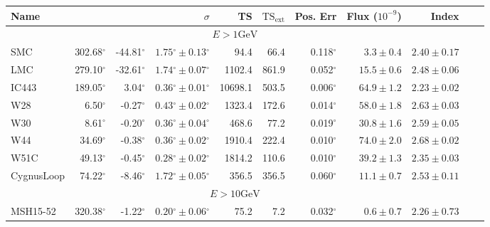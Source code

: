 \documentclass[12pt,preprint]{aastex}
\newcommand{\gev}{\text{GeV}\xspace}
\newcommand{\tsext}{{\ensuremath{\text{TS}_\text{ext}}}\xspace}
\newcommand{\glon}{\text{GLON}\xspace}
\newcommand{\glat}{\text{GLAT}\xspace}
\renewcommand{\deg}{\ensuremath{^\circ}\xspace}
\begin{document}
\clearpage
\begin{table}
    \begin{centering}
      \begin{tabular}{l|rrrrrrrrrr}
        \hline
        \hline
        Name                 &          \glon &          \glat &                    $\sigma$ &         TS &   $\tsext$ &   Pos. Err &      Flux ($10^{-9}$) &                 Index \\
        \hline
        \multicolumn{9}{c}{$E > 1 \gev$} \\
        \hline
        SMC                  &     302.68\deg &     -44.81\deg & $  1.75\deg \pm   0.13\deg$ &       94.4 &       66.4 &  0.118\deg & $    3.3 \pm     0.4$ & $   2.40 \pm    0.17$ \\
        LMC                  &     279.10\deg &     -32.61\deg & $  1.74\deg \pm   0.07\deg$ &     1102.4 &      861.9 &  0.052\deg & $   15.5 \pm     0.6$ & $   2.48 \pm    0.06$ \\
        IC443                &     189.05\deg &       3.04\deg & $  0.36\deg \pm   0.01\deg$ &    10698.1 &      503.5 &  0.006\deg & $   64.9 \pm     1.2$ & $   2.23 \pm    0.02$ \\
        W28                  &       6.50\deg &      -0.27\deg & $  0.43\deg \pm   0.02\deg$ &     1323.4 &      172.6 &  0.014\deg & $   58.0 \pm     1.8$ & $   2.63 \pm    0.03$ \\
        W30                  &       8.61\deg &      -0.20\deg & $  0.36\deg \pm   0.04\deg$ &      468.6 &       77.2 &  0.019\deg & $   30.8 \pm     1.6$ & $   2.59 \pm    0.05$ \\
        W44                  &      34.69\deg &      -0.38\deg & $  0.36\deg \pm   0.02\deg$ &     1910.4 &      222.4 &  0.010\deg & $   74.0 \pm     2.0$ & $   2.68 \pm    0.02$ \\
        W51C                 &      49.13\deg &      -0.45\deg & $  0.28\deg \pm   0.02\deg$ &     1814.2 &      110.6 &  0.010\deg & $   39.2 \pm     1.3$ & $   2.35 \pm    0.03$ \\
        CygnusLoop           &      74.22\deg &      -8.46\deg & $  1.72\deg \pm   0.05\deg$ &      356.5 &      356.5 &  0.060\deg & $   11.1 \pm     0.7$ & $   2.53 \pm    0.11$ \\
        \hline
        \multicolumn{9}{c}{$E > 10 \gev$} \\
        \hline
        MSH15-52             &     320.38\deg &      -1.22\deg & $  0.20\deg \pm   0.06\deg$ &       75.2 &        7.2 &  0.032\deg & $    0.6 \pm     0.7$ & $   2.26 \pm    0.73$ \\

\end{tabular}
\end{centering}
\end{table}
\end{document}
